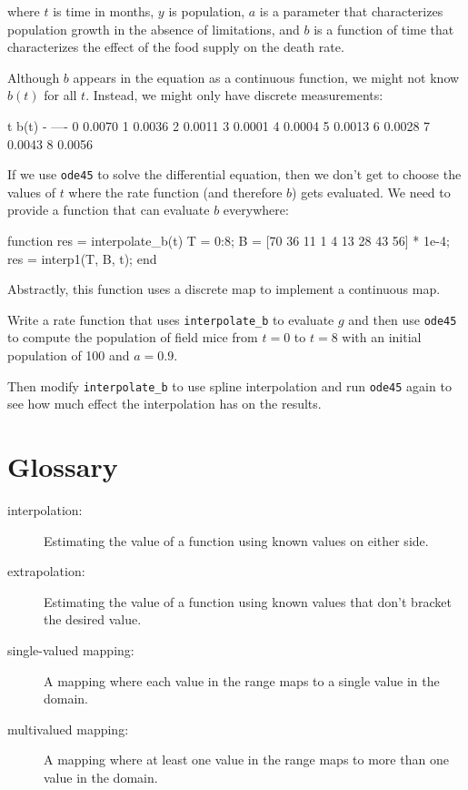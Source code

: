 \documentclass[
]{book}
\numberwithin{Answer}{chapter}
\numberwithin{Exercise}{chapter}
\begin{document}
where $t$ is time in months, $y$ is population, $a$ is a parameter
that characterizes population growth in the absence of limitations,
and $b$ is a function of time that characterizes the effect of the
food supply on the death rate.

Although $b$ appears in the equation as a continuous function, we
might not know $b(t)$ for all $t$.  Instead, we might only have discrete
measurements:

\begin{code}
t          b(t)
-          ----
0          0.0070
1          0.0036
2          0.0011
3          0.0001
4          0.0004
5          0.0013
6          0.0028
7          0.0043
8          0.0056
\end{code}

If we use {\tt ode45} to solve the differential equation, then we
don't get to choose the values of $t$ where the rate function
(and therefore $b$) gets evaluated.  We need to provide a function
that can evaluate $b$ everywhere:

\begin{code}
function res = interpolate_b(t)
    T = 0:8;
    B = [70 36 11 1 4 13 28 43 56] * 1e-4;
    res = interp1(T, B, t);
end
\end{code}

Abstractly, this function uses a discrete map to implement a
continuous map.

\begin{ex}
Write a rate function that uses
{\tt interpolate\_b} to evaluate $g$ and then
use {\tt ode45} to compute the population of field mice
from $t=0$ to $t=8$ with an initial population of 100 and
$a=0.9$.

Then modify {\tt interpolate\_b} to use spline interpolation
and run {\tt ode45} again to see how much effect the interpolation
has on the results.
\end{ex}

\section{Glossary}

\begin{description}

\item[interpolation:] Estimating the value of a function using
known values on either side.

\item[extrapolation:] Estimating the value of a function using
known values that don't bracket the desired value.

\item[single-valued mapping:] A mapping where each value in the
range maps to a single value in the domain.

\item[multivalued mapping:] A mapping where at least one value in
the range maps to more than one value in the domain.

\end{description}
\end{document}
